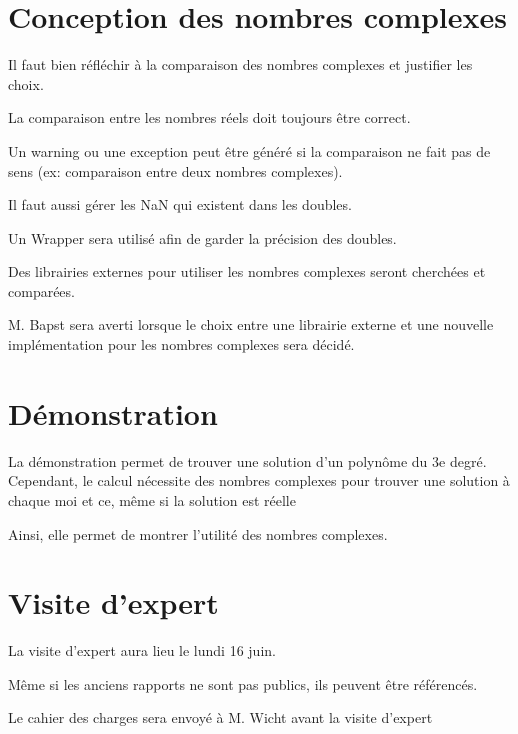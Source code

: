 \documentclass[11pt]{meetingmins}
\begin{document}
\section{Conception des nombres complexes}
\begin{hiddenitems}
    \item Il faut bien réfléchir à la comparaison des nombres complexes et justifier les choix.
    \item La comparaison entre les nombres réels doit toujours être correct.
    \item Un warning ou une exception peut être généré si la comparaison ne fait pas de sens (ex: comparaison entre deux nombres complexes).
    \item Il faut aussi gérer les NaN qui existent dans les doubles.
    \item Un Wrapper sera utilisé afin de garder la précision des doubles.
    \item Des librairies externes pour utiliser les nombres complexes seront cherchées et comparées.
    \item M. Bapst sera averti lorsque le choix entre une librairie externe et une nouvelle implémentation pour les nombres complexes sera décidé.
\end{hiddenitems}

\section{Démonstration}
\begin{hiddenitems}
    \item La démonstration permet de trouver une solution d'un polynôme du 3e degré. Cependant, le calcul nécessite des nombres complexes pour trouver une solution à chaque moi et ce, même si la solution est réelle
    \item Ainsi, elle permet de montrer l'utilité des nombres complexes.
\end{hiddenitems}

\section{Visite d'expert}
\begin{hiddenitems}
    \item La visite d'expert aura lieu le lundi 16 juin.
    \item Même si les anciens rapports ne sont pas publics, ils peuvent être référencés.
    \item Le cahier des charges sera envoyé à M. Wicht avant la visite d'expert
\end{hiddenitems}
\end{document}
